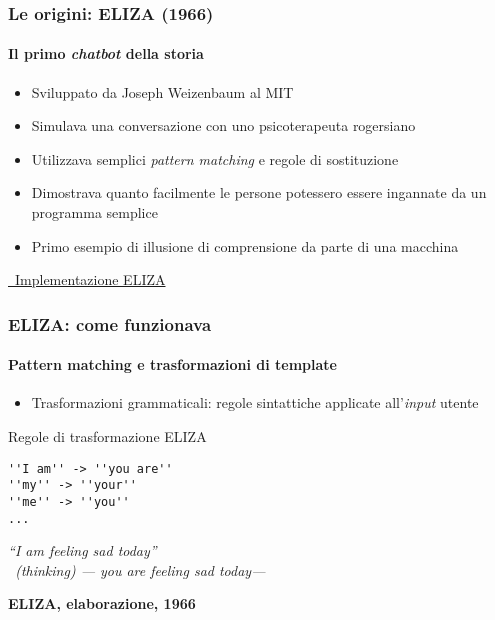 \begin{frame}[t,fragile] \frametitle{Le origini: ELIZA (1966)}
    \framesubtitle{Il primo \textit{chatbot} della storia}
	{\small
	    \begin{minipage}[t]{\textwidth}
	    	\begin{itemize}[leftmargin=10pt,align=right]
				\onslide<1->\item[\alert{\faArrowCircleRight}] Sviluppato da \alert{Joseph Weizenbaum} al MIT
				\onslide<2->\item[\alert{\faArrowCircleRight}] Simulava una conversazione con uno \alert{psicoterapeuta} rogersiano
				\onslide<3->\item[\alert{\faArrowCircleRight}] Utilizzava semplici \alert{\textit{pattern matching}} e regole di sostituzione
				\onslide<4->\item[\alert{\faArrowCircleRight}] Dimostrava quanto facilmente le persone potessero essere \alert{ingannate} da un programma semplice
				\onslide<5->\item[\alert{\faArrowCircleRight}] Primo esempio di \alert{illusione di comprensione} da parte di una macchina
			\end{itemize}
        \end{minipage}
		\vfill
		\begin{center}
			\href{https://www.masswerk.at/elizabot/eliza.html}{\faExternalLinkSquare\ Implementazione ELIZA}
		\end{center}
	}
\end{frame}
%
\begin{frame}[t,fragile] \frametitle{ELIZA: come funzionava}
	\framesubtitle{Pattern matching e trasformazioni di template}
	{\small
		\begin{itemize}[leftmargin=10pt,align=right]
			\item[\alert{\faArrowCircleRight}] \alert{Trasformazioni grammaticali:} regole sintattiche applicate all'\textit{input} utente
		\end{itemize}
		\vspace*{.3cm}
		\hspace*{4cm}
		\begin{codeblock}{Regole di trasformazione ELIZA}
        	\begin{verbatim}
''I am'' -> ''you are''
''my'' -> ''your''
''me'' -> ''you''
...
        	\end{verbatim}
    	\end{codeblock}
		\hspace*{4cm}
		\begin{minipage}[t]{.6\textwidth}
			\renewcommand{\epigraphsize}{\scriptsize}
			\setlength{\afterepigraphskip}{0pt}
			\setlength{\beforeepigraphskip}{5pt}
			\setlength{\epigraphwidth}{0.9\textwidth}
			\epigraph{\textit{\alert{\faUser} ``\alert{I am} feeling sad today''\\
			\alert{\faTerminal\ (thinking)} --- \alert{you are} feeling sad today---}}{\textbf{ELIZA, elaborazione, 1966}}
		\end{minipage}
	}
\end{frame}
